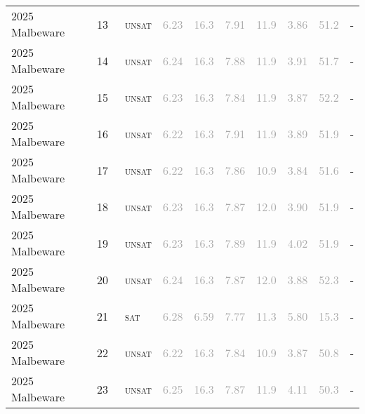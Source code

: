 \begin{center}
{\begin{longtable}{@{}llllllllll@{}}
2025 Malbeware & 13 & ~\textsc{unsat} & \textcolor{darkgray}{6.23} & \textcolor{darkgray}{16.3} & \textcolor{darkgray}{7.91} & \textcolor{darkgray}{11.9} & \textcolor{darkgray}{3.86} & \textcolor{darkgray}{51.2} & - \\
2025 Malbeware & 14 & ~\textsc{unsat} & \textcolor{darkgray}{6.24} & \textcolor{darkgray}{16.3} & \textcolor{darkgray}{7.88} & \textcolor{darkgray}{11.9} & \textcolor{darkgray}{3.91} & \textcolor{darkgray}{51.7} & - \\
2025 Malbeware & 15 & ~\textsc{unsat} & \textcolor{darkgray}{6.23} & \textcolor{darkgray}{16.3} & \textcolor{darkgray}{7.84} & \textcolor{darkgray}{11.9} & \textcolor{darkgray}{3.87} & \textcolor{darkgray}{52.2} & - \\
2025 Malbeware & 16 & ~\textsc{unsat} & \textcolor{darkgray}{6.22} & \textcolor{darkgray}{16.3} & \textcolor{darkgray}{7.91} & \textcolor{darkgray}{11.9} & \textcolor{darkgray}{3.89} & \textcolor{darkgray}{51.9} & - \\
2025 Malbeware & 17 & ~\textsc{unsat} & \textcolor{darkgray}{6.22} & \textcolor{darkgray}{16.3} & \textcolor{darkgray}{7.86} & \textcolor{darkgray}{10.9} & \textcolor{darkgray}{3.84} & \textcolor{darkgray}{51.6} & - \\
2025 Malbeware & 18 & ~\textsc{unsat} & \textcolor{darkgray}{6.23} & \textcolor{darkgray}{16.3} & \textcolor{darkgray}{7.87} & \textcolor{darkgray}{12.0} & \textcolor{darkgray}{3.90} & \textcolor{darkgray}{51.9} & - \\
2025 Malbeware & 19 & ~\textsc{unsat} & \textcolor{darkgray}{6.23} & \textcolor{darkgray}{16.3} & \textcolor{darkgray}{7.89} & \textcolor{darkgray}{11.9} & \textcolor{darkgray}{4.02} & \textcolor{darkgray}{51.9} & - \\
2025 Malbeware & 20 & ~\textsc{unsat} & \textcolor{darkgray}{6.24} & \textcolor{darkgray}{16.3} & \textcolor{darkgray}{7.87} & \textcolor{darkgray}{12.0} & \textcolor{darkgray}{3.88} & \textcolor{darkgray}{52.3} & - \\
2025 Malbeware & 21 & ~\textsc{sat} & \textcolor{darkgray}{6.28} & \textcolor{darkgray}{6.59} & \textcolor{darkgray}{7.77} & \textcolor{darkgray}{11.3} & \textcolor{darkgray}{5.80} & \textcolor{darkgray}{15.3} & - \\
2025 Malbeware & 22 & ~\textsc{unsat} & \textcolor{darkgray}{6.22} & \textcolor{darkgray}{16.3} & \textcolor{darkgray}{7.84} & \textcolor{darkgray}{10.9} & \textcolor{darkgray}{3.87} & \textcolor{darkgray}{50.8} & - \\
2025 Malbeware & 23 & ~\textsc{unsat} & \textcolor{darkgray}{6.25} & \textcolor{darkgray}{16.3} & \textcolor{darkgray}{7.87} & \textcolor{darkgray}{11.9} & \textcolor{darkgray}{4.11} & \textcolor{darkgray}{50.3} & - \\

\end{longtable}}
\end{center}
